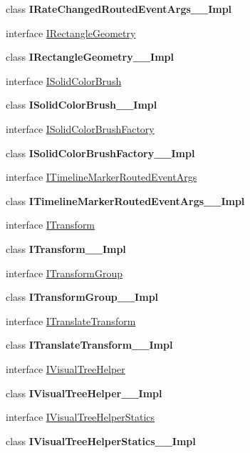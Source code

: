 \begin{DoxyCompactItemize}
class {\bfseries I\+Rate\+Changed\+Routed\+Event\+Args\+\_\+\+\_\+\+Impl}
\item 
interface \hyperlink{interface_windows_1_1_u_i_1_1_xaml_1_1_media_1_1_i_rectangle_geometry}{I\+Rectangle\+Geometry}
\item 
class {\bfseries I\+Rectangle\+Geometry\+\_\+\+\_\+\+Impl}
\item 
interface \hyperlink{interface_windows_1_1_u_i_1_1_xaml_1_1_media_1_1_i_solid_color_brush}{I\+Solid\+Color\+Brush}
\item 
class {\bfseries I\+Solid\+Color\+Brush\+\_\+\+\_\+\+Impl}
\item 
interface \hyperlink{interface_windows_1_1_u_i_1_1_xaml_1_1_media_1_1_i_solid_color_brush_factory}{I\+Solid\+Color\+Brush\+Factory}
\item 
class {\bfseries I\+Solid\+Color\+Brush\+Factory\+\_\+\+\_\+\+Impl}
\item 
interface \hyperlink{interface_windows_1_1_u_i_1_1_xaml_1_1_media_1_1_i_timeline_marker_routed_event_args}{I\+Timeline\+Marker\+Routed\+Event\+Args}
\item 
class {\bfseries I\+Timeline\+Marker\+Routed\+Event\+Args\+\_\+\+\_\+\+Impl}
\item 
interface \hyperlink{interface_windows_1_1_u_i_1_1_xaml_1_1_media_1_1_i_transform}{I\+Transform}
\item 
class {\bfseries I\+Transform\+\_\+\+\_\+\+Impl}
\item 
interface \hyperlink{interface_windows_1_1_u_i_1_1_xaml_1_1_media_1_1_i_transform_group}{I\+Transform\+Group}
\item 
class {\bfseries I\+Transform\+Group\+\_\+\+\_\+\+Impl}
\item 
interface \hyperlink{interface_windows_1_1_u_i_1_1_xaml_1_1_media_1_1_i_translate_transform}{I\+Translate\+Transform}
\item 
class {\bfseries I\+Translate\+Transform\+\_\+\+\_\+\+Impl}
\item 
interface \hyperlink{interface_windows_1_1_u_i_1_1_xaml_1_1_media_1_1_i_visual_tree_helper}{I\+Visual\+Tree\+Helper}
\item 
class {\bfseries I\+Visual\+Tree\+Helper\+\_\+\+\_\+\+Impl}
\item 
interface \hyperlink{interface_windows_1_1_u_i_1_1_xaml_1_1_media_1_1_i_visual_tree_helper_statics}{I\+Visual\+Tree\+Helper\+Statics}
\item 
class {\bfseries I\+Visual\+Tree\+Helper\+Statics\+\_\+\+\_\+\+Impl}
\item 

\end{DoxyCompactItemize}

